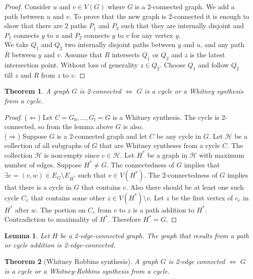 \documentclass{article}
\newtheorem*{thm}{Theorem}
\newtheorem*{lem}{Lemma}
\theoremstyle{definition}
\begin{document}
\begin{proof}
Consider $u$ and $v\in V(G)$ where $G$ is a 2-connected graph.
We add a path between $u$ and $v$.
To prove that the new graph is 2-connected it is enough to show that there are 2 paths $P_1$ and $P_2$ such that they are internally disjoint and $P_1$ connects $y$ to $u$ and $P_2$ connects $y$ to $v$ for any vertex $y$. \\
We take $Q_1$ and $Q_2$ two internally disjoint paths between $y$ and $u$, and any path $R$ between $y$ and $v$.
Assume that $R$ intersects $Q_1$ or $Q_2$ and $z$ is the latest intersection point.
Without loss of generality $z\in Q_2$.
Choose $Q_1$ and follow $Q_2$ till $z$ and $R$ from $z$ to $v$.
\end{proof}

\begin{thm}
A graph $G$ is 2-connected $\iff$ $G$ is a cycle or a Whitney synthesis from a cycle.
\end{thm}

\begin{proof}
($\Leftarrow$) Let $C=G_0,\ldots,G_l=G$ is a Whitney synthesis.
The cycle is 2-connected, so from the lemma above $G$ is also.\\
($\Rightarrow$) Suppose $G$ is a 2-connected graph and let $C$ be any cycle in $G$.
Let $\mathcal{H}$ be a collection of all subgraphs of $G$ that are Whitney syntheses from a cycle $C$.
The collection $\mathcal{H}$ is non-empty since $c\in\mathcal{H}$.
Let $H^*$ be a graph in $\mathcal{H}$ with maximum number of edges.
Suppose $H^*\ne G$.
The connectedness of $G$ implies that $\exists e=(v,w)\in E_G\setminus E_{H^*}$ such that $v\in V(H^*)$.
The 2-connectedness of $G$ implies that there is a cycle in $G$ that contains $e$.
Also there should be at least one such cycle $C_e$ that contains some other $z\in V(H^*)\setminus v$.
Let $z$ be the first vertex of $c_e$ in $H^*$ after $w$.
The portion on $C_e$ from $v$ to $z$ is a path addition to $H^*$.
Contradiction to maximality of $H^*$.
Therefore $H^* = G$.
\end{proof}

\begin{lem}
Let $H$ be a 2-edge-connected graph.
The graph that results from a path or cycle addition is 2-edge-connected.
\end{lem}

\begin{thm}[Whitney Robbins synthesis]
A graph $G$ is 2-edge connected $\iff$ $G$ is a cycle or a Whitney-Robbins synthesis from a cycle.
\end{thm}
\end{document}
